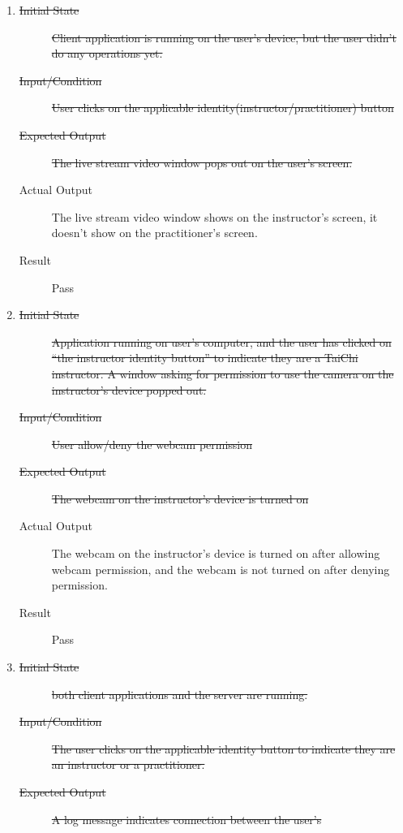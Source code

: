 \documentclass[12pt, titlepage]{article}
\begin{document}
\begin{enumerate}[FR-T1]
  \item \label{FRT1}
    \begin{description}
    \item[\sout{Initial State}]\sout{ Client application is running on the user's device, but
      the user didn’t do any operations yet.
    }
		\item[\sout{Input/Condition}]\sout{ User clicks on the applicable
      identity(instructor/practitioner) button
    }
		\item[\sout{Expected Output}]\sout{ The live stream video window pops out on the user's
      screen.
    }
		\item[Actual Output] The live stream video window shows on the instructor's
      screen, it doesn't show on the practitioner's screen.
    \item[Result] Pass
    \end{description}
  \item \label{FRT2}
    \begin{description}
    \item[\sout{Initial State}]\sout{ Application running on user’s computer, and the user has
      clicked on “the instructor identity button” to indicate they are a TaiChi
      instructor. A window asking for permission to use the camera on the
      instructor's device popped out.
    }
		\item[\sout{Input/Condition}]\sout{ User allow/deny the webcam permission
    }
		\item[\sout{Expected Output}]\sout{ The webcam on the instructor’s device is turned on
    }
		\item[Actual Output] The webcam on the instructor’s device is turned on after
      allowing webcam permission, and the webcam is not turned on after denying
      permission.
    \item[Result] Pass
    \end{description}
  \item \label{FRT3}
    \begin{description}
    \item[\sout{Initial State}]\sout{ both client applications and the server are running.
    }
		\item[\sout{Input/Condition}]\sout{ The user clicks on the applicable identity button to
      indicate they are an instructor or a practitioner.
    }
		\item[\sout{Expected Output}]\sout{ A log message indicates connection between the user’s
}
\end{description}
\end{enumerate}
\end{document}
